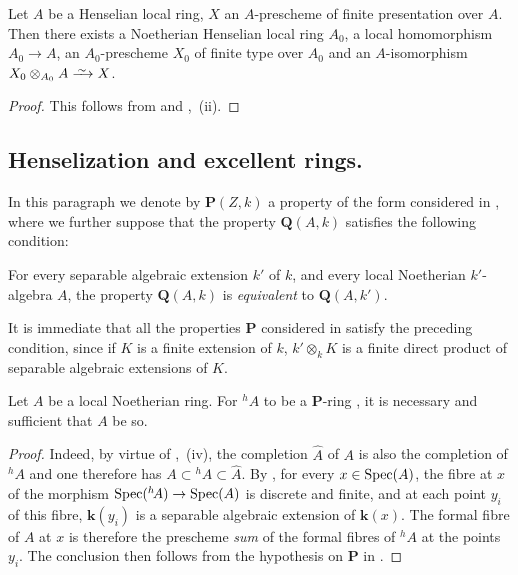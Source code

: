 \begin{corollary}[18.6.15]
\label{IV.18.6.15}
Let $A$ be a Henselian local ring, $X$ an $A$-prescheme of finite presentation over $A$.
Then there exists a Noetherian Henselian local ring $A_0$, a local homomorphism $A_0\to A$, an $A_0$-prescheme $X_0$ of finite type over $A_0$ and an $A$-isomorphism $X_0\otimes_{A_0}A\simto X$.
\end{corollary}

\begin{proof}
This follows from  and ,~(ii).
\end{proof}


\subsection{Henselization and excellent rings.}
\label{subsection:IV.18.7}

\begin{env}[18.7.1]
\label{IV.18.7.1}
In this paragraph we denote by $\boldsymbol{P}(Z,k)$ a property of the form considered in , where we further suppose that the property $\boldsymbol{Q}(A,k)$ satisfies the following condition:

For every separable algebraic extension $k'$ of $k$, and every local Noetherian $k'$-algebra $A$, the property $\boldsymbol{Q}(A,k)$ is \emph{equivalent} to $\boldsymbol{Q}(A,k')$.

It is immediate that all the properties $\boldsymbol{P}$ considered in  satisfy the preceding condition, since if $K$ is a finite extension of $k$, $k'\otimes_kK$ is a finite direct product of separable algebraic extensions of $K$.
\end{env}


\begin{proposition}[18.7.2]
\label{IV.18.7.2}
Let $A$ be a local Noetherian ring.
For ${}^h\!A$ to be a $\boldsymbol{P}$-ring , it is necessary and sufficient that $A$ be so.
\end{proposition}

\begin{proof}
Indeed, by virtue of ,~(iv), the completion $\hat{A}$ of $A$ is also the completion of ${}^h\!A$ and one therefore has $A\subset{}^h\!A\subset\hat{A}$.
By , for every $x\in\operatorname{Spec}(A)$, the fibre at $x$ of the morphism $\operatorname{Spec}({}^h\!A)\to\operatorname{Spec}(A)$ is discrete and finite, and at each point $y_i$ of this fibre, $\boldsymbol{k}(y_i)$ is a separable algebraic extension of $\boldsymbol{k}(x)$.
The formal fibre of $A$ at $x$ is therefore the prescheme \emph{sum} of the formal fibres of ${}^h\!A$ at the points $y_i$.
The conclusion then follows from the hypothesis on $\boldsymbol{P}$ in .
\end{proof}

